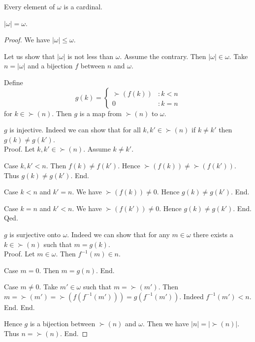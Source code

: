 \documentclass[../set-theory.tex]{subfiles}
\begin{document}
  \begin{forthel}
    \begin{corollary}
      Every element of $\omega$ is a cardinal.
    \end{corollary}
  \end{forthel}

  \begin{forthel}
    \begin{proposition}
      $|\omega| = \omega$.
    \end{proposition}
    \begin{proof}
      We have $|\omega| \leq \omega$.

      Let us show that $|\omega|$ is not less than $\omega$.
        Assume the contrary.
        Then $|\omega| \in \omega$.
        Take $n = |\omega|$ and a bijection $f$ between $n$ and $\omega$.

        Define \[ g(k) =
          \begin{cases}
            \succ(f(k)) & : k < n
            \\
            0           & : k = n
          \end{cases} \]
        for $k \in \succ(n)$.
        Then $g$ is a map from $\succ(n)$ to $\omega$.

        $g$ is injective.
        Indeed we can show that for all $k, k' \in \succ(n)$ if $k \neq k'$
        then $g(k) \neq g(k')$. \\
        Proof.
          Let $k, k' \in \succ(n)$.
          Assume $k \neq k'$.

          Case $k, k' < n$.
            Then $f(k) \neq f(k')$.
            Hence $\succ(f(k)) \neq \succ(f(k'))$.
            Thus $g(k) \neq g(k')$.
          End.

          Case $k < n$ and $k' = n$.
            We have $\succ(f(k)) \neq 0$.
            Hence $g(k) \neq g(k')$.
          End.

          Case $k = n$ and $k' < n$.
            We have $\succ(f(k')) \neq 0$.
            Hence $g(k) \neq g(k')$.
          End.
        Qed.

        $g$ is surjective onto $\omega$.
        Indeed we can show that for any $m \in \omega$ there exists a
        $k \in \succ(n)$ such that $m = g(k)$. \\
        Proof.
          Let $m \in \omega$.
          Then $f^{-1}(m) \in n$.

          Case $m = 0$.
            Then $m = g(n)$.
          End.

          Case $m \neq 0$.
            Take $m' \in \omega$ such that $m = \succ(m')$.
            Then $m
              = \succ(m')
              = \succ(f(f^{-1}(m')))
              = g(f^{-1}(m'))$.
            Indeed $f^{-1}(m') < n$.
          End.
        End.

        Hence $g$ is a bijection between $\succ(n)$ and $\omega$.
        Then we have $|n| = |\succ(n)|$.
        Thus $n = \succ(n)$.
      End.
    \end{proof}
  \end{forthel}
\end{document}
